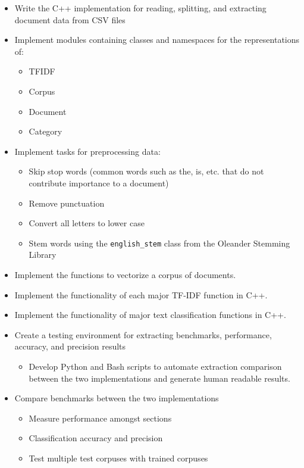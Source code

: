 \documentclass[conference]{IEEEtran}
\newcommand{\code}[1]{\lstinline[basicstyle=\ttfamily]|#1|}
\begin{document}
\begin{itemize}
    \item Write the C++ implementation for reading, splitting, and extracting document data from CSV files
    \item Implement modules containing classes and namespaces for the representations of:
    {
        \begin{itemize}    
            \item TFIDF
            \item Corpus
            \item Document
            \item Category
        \end{itemize}
    }
    \item Implement tasks for preprocessing data:
    {
        \begin{itemize}    
            \item Skip stop words (common words such as the, is, etc. that do not contribute importance to a document)
            \item Remove punctuation
            \item Convert all letters to lower case
            \item Stem words using the \code{english_stem} class from the Oleander Stemming Library~\cite{b5}
        \end{itemize}
    }
    \item Implement the functions to vectorize a corpus of documents.
    \item Implement the functionality of each major TF-IDF function in C++.
    \item Implement the functionality of major text classification functions in C++.
    \item Create a testing environment for extracting benchmarks, performance, accuracy, and precision results
    {
        \begin{itemize}    
            \item Develop Python and Bash scripts to automate extraction comparison between the two implementations and generate human readable results.
        \end{itemize}
    }
    \item Compare benchmarks between the two implementations
    {
        \begin{itemize}    
            \item Measure performance amongst sections
            \item Classification accuracy and precision
            \item Test multiple test corpuses with trained corpuses
        \end{itemize}
    }
\end{itemize}
\end{document}
